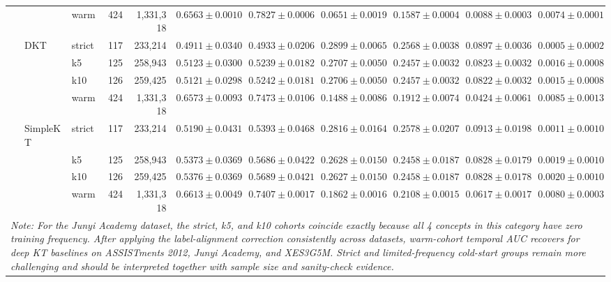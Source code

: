 \begin{table}[tbp]
{\begin{tabular}{lllcrcccccc}
 &  & warm & 424 & 1,331,318 & $0.6563 \pm 0.0010$ & $0.7827 \pm 0.0006$ & $0.0651 \pm 0.0019$ & $0.1587 \pm 0.0004$ & $0.0088 \pm 0.0003$ & $0.0074 \pm 0.0001$ \\
 & DKT & strict & 117 & 233,214 & $0.4911 \pm 0.0340$ & $0.4933 \pm 0.0206$ & $0.2899 \pm 0.0065$ & $0.2568 \pm 0.0038$ & $0.0897 \pm 0.0036$ & $0.0005 \pm 0.0002$ \\
 &  & k5 & 125 & 258,943 & $0.5123 \pm 0.0300$ & $0.5239 \pm 0.0182$ & $0.2707 \pm 0.0050$ & $0.2457 \pm 0.0032$ & $0.0823 \pm 0.0032$ & $0.0016 \pm 0.0008$ \\
 &  & k10 & 126 & 259,425 & $0.5121 \pm 0.0298$ & $0.5242 \pm 0.0181$ & $0.2706 \pm 0.0050$ & $0.2457 \pm 0.0032$ & $0.0822 \pm 0.0032$ & $0.0015 \pm 0.0008$ \\
 &  & warm & 424 & 1,331,318 & $0.6573 \pm 0.0093$ & $0.7473 \pm 0.0106$ & $0.1488 \pm 0.0086$ & $0.1912 \pm 0.0074$ & $0.0424 \pm 0.0061$ & $0.0085 \pm 0.0013$ \\
 & SimpleKT & strict & 117 & 233,214 & $0.5190 \pm 0.0431$ & $0.5393 \pm 0.0468$ & $0.2816 \pm 0.0164$ & $0.2578 \pm 0.0207$ & $0.0913 \pm 0.0198$ & $0.0011 \pm 0.0010$ \\
 &  & k5 & 125 & 258,943 & $0.5373 \pm 0.0369$ & $0.5686 \pm 0.0422$ & $0.2628 \pm 0.0150$ & $0.2458 \pm 0.0187$ & $0.0828 \pm 0.0179$ & $0.0019 \pm 0.0010$ \\
 &  & k10 & 126 & 259,425 & $0.5376 \pm 0.0369$ & $0.5689 \pm 0.0421$ & $0.2627 \pm 0.0150$ & $0.2458 \pm 0.0187$ & $0.0828 \pm 0.0178$ & $0.0020 \pm 0.0010$ \\
 &  & warm & 424 & 1,331,318 & $0.6613 \pm 0.0049$ & $0.7407 \pm 0.0017$ & $0.1862 \pm 0.0016$ & $0.2108 \pm 0.0015$ & $0.0617 \pm 0.0017$ & $0.0080 \pm 0.0003$ \\
\bottomrule
\multicolumn{11}{p{8.2cm}}{\scriptsize \textit{Note: For the Junyi Academy dataset, the strict, k5, and k10 cohorts coincide exactly because all 4 concepts in this category have zero training frequency. After applying the label-alignment correction consistently across datasets, warm-cohort temporal AUC recovers for deep KT baselines on ASSISTments 2012, Junyi Academy, and XES3G5M. Strict and limited-frequency cold-start groups remain more challenging and should be interpreted together with sample size and sanity-check evidence.}} \\
\end{tabular}%
}
\end{table}

